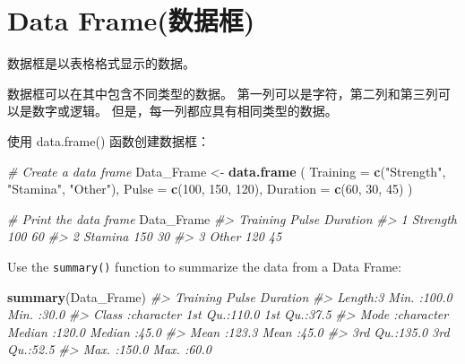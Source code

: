 \documentclass[
]{book}
\newenvironment{Shaded}{\begin{snugshade}}{\end{snugshade}}
\newcommand{\AttributeTok}[1]{\textcolor[rgb]{0.13,0.29,0.53}{#1}}
\newcommand{\CommentTok}[1]{\textcolor[rgb]{0.56,0.35,0.01}{\textit{#1}}}
\newcommand{\DecValTok}[1]{\textcolor[rgb]{0.00,0.00,0.81}{#1}}
\newcommand{\FunctionTok}[1]{\textcolor[rgb]{0.13,0.29,0.53}{\textbf{#1}}}
\newcommand{\NormalTok}[1]{#1}
\newcommand{\OtherTok}[1]{\textcolor[rgb]{0.56,0.35,0.01}{#1}}
\newcommand{\StringTok}[1]{\textcolor[rgb]{0.31,0.60,0.02}{#1}}
\begin{document}
\hypertarget{data-frameux6570ux636eux6846}{%
\section{Data Frame(数据框)}\label{data-frameux6570ux636eux6846}}

数据框是以表格格式显示的数据。

数据框可以在其中包含不同类型的数据。 第一列可以是字符，第二列和第三列可以是数字或逻辑。 但是，每一列都应具有相同类型的数据。

使用 data.frame() 函数创建数据框：

\begin{Shaded}
\begin{Highlighting}[]
\CommentTok{\# Create a data frame}
\NormalTok{Data\_Frame }\OtherTok{\textless{}{-}} \FunctionTok{data.frame}\NormalTok{ (}
  \AttributeTok{Training =} \FunctionTok{c}\NormalTok{(}\StringTok{"Strength"}\NormalTok{, }\StringTok{"Stamina"}\NormalTok{, }\StringTok{"Other"}\NormalTok{),}
  \AttributeTok{Pulse =} \FunctionTok{c}\NormalTok{(}\DecValTok{100}\NormalTok{, }\DecValTok{150}\NormalTok{, }\DecValTok{120}\NormalTok{),}
  \AttributeTok{Duration =} \FunctionTok{c}\NormalTok{(}\DecValTok{60}\NormalTok{, }\DecValTok{30}\NormalTok{, }\DecValTok{45}\NormalTok{)}
\NormalTok{)}

\CommentTok{\# Print the data frame}
\NormalTok{Data\_Frame}
\CommentTok{\#\textgreater{}   Training Pulse Duration}
\CommentTok{\#\textgreater{} 1 Strength   100       60}
\CommentTok{\#\textgreater{} 2  Stamina   150       30}
\CommentTok{\#\textgreater{} 3    Other   120       45}
\end{Highlighting}
\end{Shaded}

Use the \texttt{summary()} function to summarize the data from a Data Frame:

\begin{Shaded}
\begin{Highlighting}[]
\FunctionTok{summary}\NormalTok{(Data\_Frame)}
\CommentTok{\#\textgreater{}    Training             Pulse          Duration   }
\CommentTok{\#\textgreater{}  Length:3           Min.   :100.0   Min.   :30.0  }
\CommentTok{\#\textgreater{}  Class :character   1st Qu.:110.0   1st Qu.:37.5  }
\CommentTok{\#\textgreater{}  Mode  :character   Median :120.0   Median :45.0  }
\CommentTok{\#\textgreater{}                     Mean   :123.3   Mean   :45.0  }
\CommentTok{\#\textgreater{}                     3rd Qu.:135.0   3rd Qu.:52.5  }
\CommentTok{\#\textgreater{}                     Max.   :150.0   Max.   :60.0}
\end{Highlighting}
\end{Shaded}
\end{document}
